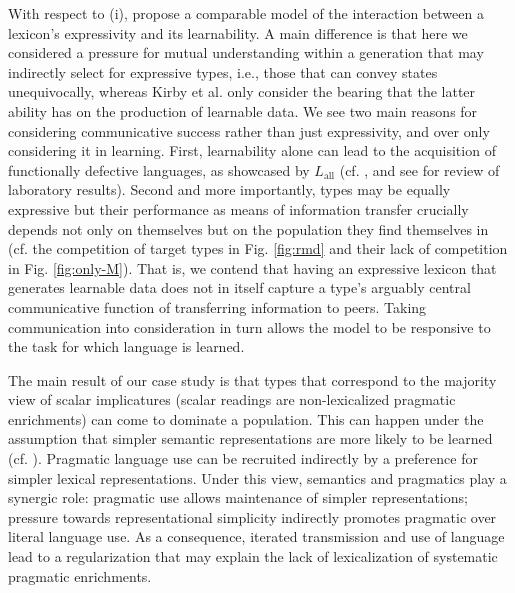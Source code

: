 \documentclass[a4paper, 11pt]{article}
\theoremstyle{Satz}
\newcommand{\mylang}[1]{\ensuremath{L_{\text{#1}}}\xspace} %
\newcommand{\Lall}{\mylang{all}}
\begin{document}
With respect to (i), \citet{kirby+etal:2015} propose a comparable model of the interaction
between a lexicon's expressivity and its learnability. A main difference is that here we
considered a pressure for mutual understanding within a generation that may indirectly select
for expressive types, i.e., those that can convey states unequivocally, whereas Kirby et
al. only consider the bearing that the latter ability has on the production of learnable
data. We see two main reasons for considering communicative success rather than just
expressivity, and over only considering it in learning. First, learnability alone can lead to the
acquisition of functionally defective languages, as showcased by $\Lall$
(cf. \citealt{kirby+etal:2008,silvey+etal:2014}, and see \citealt{fay+etal:2013} for review of
laboratory results). Second and more importantly, types may be equally expressive but their
performance as means of information transfer crucially depends not only on themselves but on
the population they find themselves in (cf. the competition of target types in Fig. 
\ref{fig:rmd} and their lack of competition in Fig. \ref{fig:only-M}). That is, we contend
that having an expressive lexicon that generates learnable data does not in itself capture a
type's arguably central communicative function of transferring information to peers. Taking communication
into consideration in turn allows the model to be responsive to the task for which language is learned. 

The main result of our case study is that types that correspond to the majority view of scalar
implicatures (scalar readings are non-lexicalized pragmatic enrichments) can come to dominate a
population. This can happen under the assumption that simpler semantic representations are more
likely to be learned (cf. \citealt{chater+vitanyi:2003}). Pragmatic language use can be
recruited indirectly by a preference for simpler lexical representations. Under this view, semantics
and pragmatics play a synergic role: pragmatic use allows maintenance of simpler representations;
pressure towards representational simplicity indirectly promotes pragmatic over literal
language use. As a consequence, iterated transmission and use of language lead to a
regularization that may explain the lack of lexicalization of systematic pragmatic enrichments.
\end{document}

